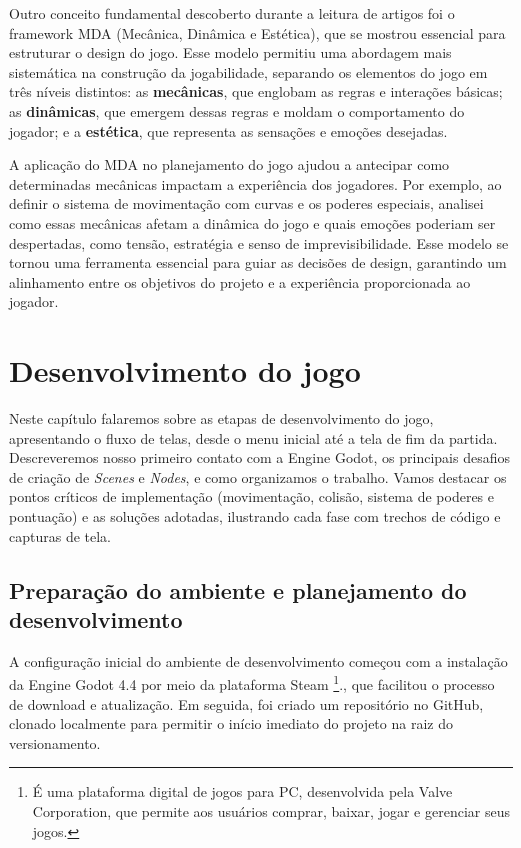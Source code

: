Outro conceito fundamental descoberto durante a leitura de artigos foi o framework MDA (Mecânica, Dinâmica e Estética), que se mostrou essencial para estruturar o design do jogo. Esse modelo permitiu uma abordagem mais sistemática na construção da jogabilidade, separando os elementos do jogo em três níveis distintos: as \textbf{mecânicas}, que englobam as regras e interações básicas; as \textbf{dinâmicas}, que emergem dessas regras e moldam o comportamento do jogador; e a \textbf{estética}, que representa as sensações e emoções desejadas.

A aplicação do MDA no planejamento do jogo ajudou a antecipar como determinadas mecânicas impactam a experiência dos jogadores. Por exemplo, ao definir o sistema de movimentação com curvas e os poderes especiais, analisei como essas mecânicas afetam a dinâmica do jogo e quais emoções poderiam ser despertadas, como tensão, estratégia e senso de imprevisibilidade. Esse modelo se tornou uma ferramenta essencial para guiar as decisões de design, garantindo um alinhamento entre os objetivos do projeto e a experiência proporcionada ao jogador.

\section{Desenvolvimento do jogo}

Neste capítulo falaremos sobre as etapas de desenvolvimento do jogo, apresentando o fluxo de telas, desde o menu inicial até a tela de fim da partida. Descreveremos nosso primeiro contato com a Engine Godot, os principais desafios de criação de \textit{Scenes} e \textit{Nodes}, e como organizamos o trabalho. Vamos destacar os pontos críticos de implementação (movimentação, colisão, sistema de poderes e pontuação) e as soluções adotadas, ilustrando cada fase com trechos de código e capturas de tela.

\subsection{Preparação do ambiente e planejamento do desenvolvimento}

A configuração inicial do ambiente de desenvolvimento começou com a instalação da Engine Godot 4.4 por meio da plataforma Steam \footnote{É uma plataforma digital de jogos para PC, desenvolvida pela Valve Corporation, que permite aos usuários comprar, baixar, jogar e gerenciar seus jogos.}., que facilitou o processo de download e atualização. Em seguida, foi criado um repositório no GitHub, clonado localmente para permitir o início imediato do projeto na raiz do versionamento.

